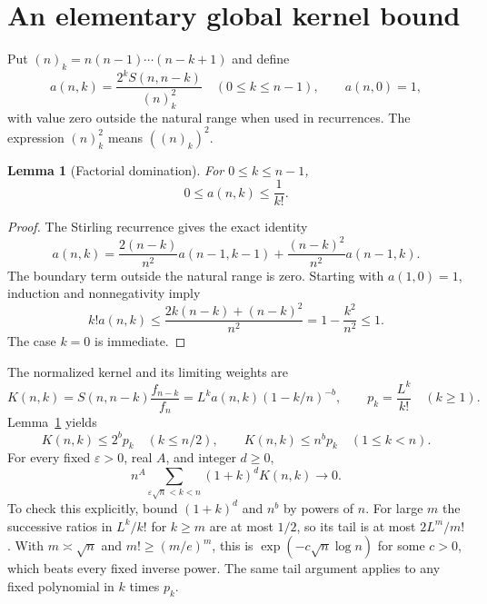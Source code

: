 \documentclass[11pt,letterpaper]{article}
\newtheorem{lemma}[theorem]{Lemma}
\theoremstyle{definition}\newtheorem{definition}[theorem]{Definition}
\theoremstyle{remark}\newtheorem{remark}[theorem]{Remark}
\newcommand{\fall}[2]{(#1)_{#2}}
\begin{document}
\section{An elementary global kernel bound}\label{spc:sec:domination}
Put $\fall nk=n(n-1)\cdots(n-k+1)$ and define
\[
 a(n,k)=\frac{2^kS(n,n-k)}{\fall nk^2}\quad(0\le k\le n-1),
 \qquad a(n,0)=1,
\]
with value zero outside the natural range when used in recurrences. The expression $\fall nk^2$ means $(\fall nk)^2$.
\begin{lemma}[Factorial domination]\label{spc:lem:factorial}
For $0\le k\le n-1$,
\begin{equation}\label{spc:eq:a-bound}
 0\le a(n,k)\le\frac1{k!}.
\end{equation}
\end{lemma}
\begin{proof}
The Stirling recurrence gives the exact identity
\begin{equation}\label{spc:eq:arec}
 a(n,k)=\frac{2(n-k)}{n^2}a(n-1,k-1)
       +\frac{(n-k)^2}{n^2}a(n-1,k).
\end{equation}
The boundary term outside the natural range is zero. Starting with $a(1,0)=1$, induction and nonnegativity imply
\[
 k!a(n,k)\le\frac{2k(n-k)+(n-k)^2}{n^2}
       =1-\frac{k^2}{n^2}\le1.
\]
The case $k=0$ is immediate.
\end{proof}
The normalized kernel and its limiting weights are
\begin{equation}\label{spc:eq:K}
 K(n,k)=S(n,n-k)\frac{f_{n-k}}{f_n}
 =L^ka(n,k)(1-k/n)^{-b},\qquad p_k=\frac{L^k}{k!}\quad(k\ge1).
\end{equation}
Lemma~\ref{spc:lem:factorial} yields
\begin{equation}\label{spc:eq:global}
 K(n,k)\le 2^bp_k\quad(k\le n/2),\qquad
 K(n,k)\le n^bp_k\quad(1\le k<n).
\end{equation}
For every fixed $\varepsilon>0$, real $A$, and integer $d\ge0$,
\begin{equation}\label{spc:eq:superpoly}
 n^A\sum_{\varepsilon\sqrt n<k<n}(1+k)^dK(n,k)\longrightarrow0.
\end{equation}
To check this explicitly, bound $(1+k)^d$ and $n^b$ by powers of $n$. For large $m$ the successive ratios in $L^k/k!$ for $k\ge m$ are at most $1/2$, so its tail is at most $2L^m/m!$. With $m\asymp\sqrt n$ and $m!\ge(m/e)^m$, this is $\exp(-c\sqrt n\log n)$ for some $c>0$, which beats every fixed inverse power. The same tail argument applies to any fixed polynomial in $k$ times $p_k$.
\end{document}
